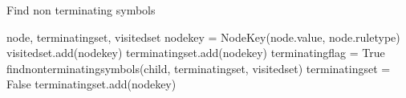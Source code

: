 \begin{algorithm}[H]
\caption{Find non terminating symbols}
\begin{algorithmic}[1] 
\Require node, terminating\textunderscore set, visited\textunderscore set
\State node\textunderscore key = Node\textunderscore Key(node.value, node.rule\textunderscore type)
	\State visited\textunderscore set.add(node\textunderscore key)
			\State terminating\textunderscore set.add(node\textunderscore key)
		\Else
			\State terminating\textunderscore flag = True
				\State find\textunderscore non\textunderscore terminating\textunderscore symbols(child, terminating\textunderscore set, visited\textunderscore set)		
					\State terminating\textunderscore set = False
				\EndIf
			\EndFor
				\State terminating\textunderscore set.add(node\textunderscore key)
			\EndIf
		\EndIf
	\EndFor
\EndIf
\end{algorithmic}
\label{alg:find_non_terminating_symbols}
\end{algorithm}

